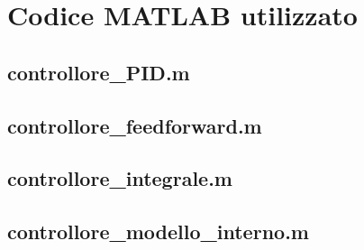 \section{Codice MATLAB utilizzato}
\label{app:MATLAB}
	
	\subsection{controllore\_PID.m}
	\label{subapp:controllorePID}
	
	
	\subsection{controllore\_feedforward.m}
	\label{subapp:controlloreFF}
	
	
	\subsection{controllore\_integrale.m}
	\label{subapp:controlloreIntegrale}
		
	
	\subsection{controllore\_modello\_interno.m}
	\label{subapp:controlloreModelloInterno}
	
	
	